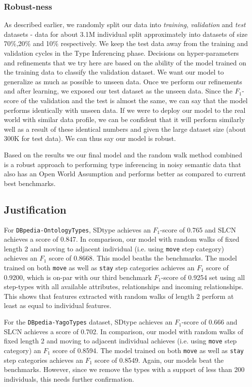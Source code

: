 \documentclass[runningheads,a4paper]{IEEEtran}
\begin{document}
\subsubsection{Robust-ness}
As described earlier, we randomly split our data into \textit{training}, \textit{validation} and \textit{test} datasets - data for about 3.1M individual split approximately into datasets of size 70\%,20\% and 10\% respectively. We keep the test data away from the training and validation cycles in the Type Inferencing phase. Decisions on hyper-parameters and refinements that we try here are based on the ability of the model trained on the training data to classify the validation dataset. We want our model to generalize as much as possible to unseen data. Once we perform our refinements and after learning, we exposed our test dataset as the unseen data. Since the $F_1$-score of the validation and the test is almost the same, we can say that the model performs identically with unseen data. If we were to deploy our model to the real world with similar data profile, we can be confident that it will perform similarly well as a result of these identical numbers and given the large dataset size (about 300K for test data). We can thus say our model is robust.

Based on the results we our final model and the random walk method combined is a robust approach to performing type inferencing in noisy semantic data that also has an Open World Assumption and performs better as compared to current best benchmarks. 

\subsection{Justification}
For \texttt{DBpedia-OntologyTypes}, SDtype achieves an $F_1$-score of  0.765 and SLCN\cite{melo2016type} achieves a score of 0.847. In comparison, our model with random walks of fixed length 2 and moving to adjacent individual (i.e. using \texttt{move} step category) achieves an $F_1$ score of 0.8668. This model beaths the benchmarks. The model trained on both \texttt{move} as well as \texttt{stay} step categories achieves an $F_1$ score of 0.9200, which is on-par with our third benchmark $F_1$-score of 0.9254 set using all step-types with all available attributes, relationships and incoming relationships. This shows that features extracted with random walks of length 2 perform at least as equal to individual features. 

For the \texttt{DBpedia-YagoTypes} dataset, SDtype achieves an $F_1$-score of 0.666 and SLCN\cite{melo2016type} achieves a score of 0.702. In comparison, our model with random walks of fixed length 2 and moving to adjacent individual achieves (i.e. using \texttt{move} step category) an $F_1$ score of 0.8594. The model trained on both \texttt{move} as well as \texttt{stay} step categories achieves an $F_1$ score of 0.8549. Again, our models beat the benchmarks. However, since we remove the types with a support of less than 200 individuals, this needs further confirmation.
\end{document}
